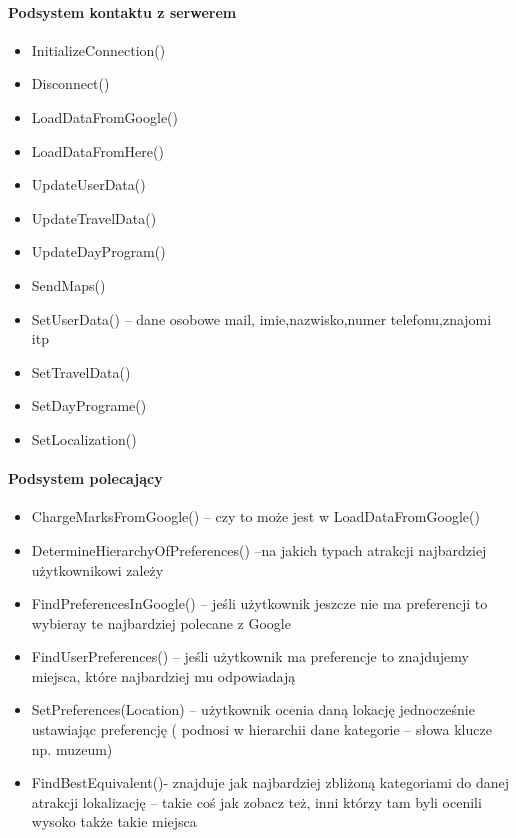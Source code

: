 \documentclass[10pt,twoside,a4paper]{report}
\begin{document}
\paragraph{Podsystem kontaktu z serwerem}
\begin{itemize}
\item InitializeConnection()
\item Disconnect()
\item LoadDataFromGoogle()
\item LoadDataFromHere()
\item UpdateUserData()
\item UpdateTravelData()
\item UpdateDayProgram()
\item SendMaps()
\item SetUserData() – dane osobowe mail, imie,nazwisko,numer telefonu,znajomi itp
\item SetTravelData()
\item SetDayPrograme()
\item SetLocalization()

\end{itemize}

\paragraph{Podsystem polecający}
\begin{itemize}
\item ChargeMarksFromGoogle() – czy to  może jest w  LoadDataFromGoogle()
\item DetermineHierarchyOfPreferences() –na jakich typach atrakcji najbardziej użytkownikowi zależy
\item FindPreferencesInGoogle() – jeśli użytkownik jeszcze nie ma preferencji to wybieray te najbardziej polecane z Google
\item FindUserPreferences() – jeśli użytkownik ma preferencje to znajdujemy miejsca, które najbardziej mu odpowiadają
\item SetPreferences(Location) – użytkownik ocenia daną lokację jednocześnie ustawiając preferencję ( podnosi w hierarchii dane kategorie – słowa klucze np. muzeum)
\item FindBestEquivalent()- znajduje jak najbardziej zbliżoną kategoriami do danej atrakcji lokalizację – takie coś jak zobacz też, inni którzy tam byli ocenili wysoko także takie miejsca

\end{itemize}
\end{document}
